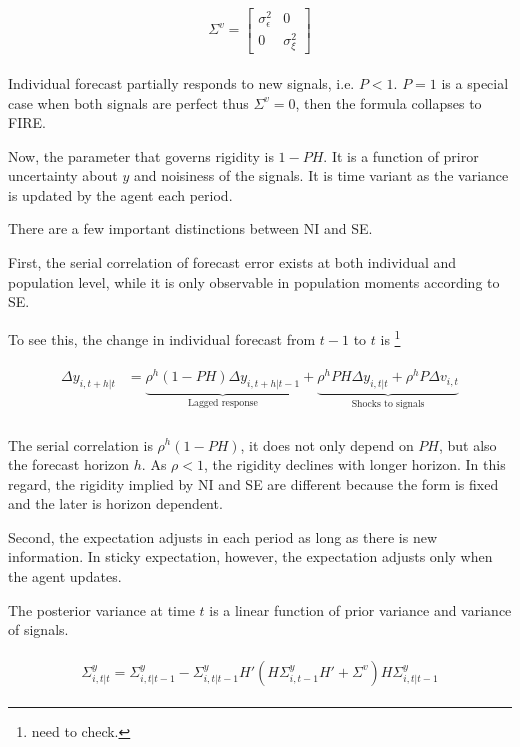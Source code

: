 \documentclass[]{article}
\begin{document}
\begin{eqnarray}
\begin{aligned}
 \Sigma^v =  \left[ \begin{matrix} 
  \sigma^2_{\epsilon} &  0 \\ 
  0 & \sigma^2_\xi \end{matrix}\right] 
\end{aligned}
\end{eqnarray}

Individual forecast partially responds to new signals, i.e. $P<1$. $P=1$ is a special case when both signals are perfect thus $\Sigma^v = 0$, then the formula collapses to FIRE. 

Now, the parameter that governs rigidity is $1-PH$. It is a function of priror uncertainty about $y$ and noisiness of the signals. It is time variant as the variance is updated by the agent each period.  

There are a few important distinctions between NI and SE. 

First, the serial correlation of forecast error exists at both individual and population level, while it is only observable in population moments according to SE. 

To see this, the change in individual forecast from $t-1$ to $t$ is \footnote{need to check.}

\begin{eqnarray}
\begin{aligned}
\Delta y_{i,t+h|t} & = \underbrace{\rho^h (1-PH)\Delta y_{i,t+h|t-1}}_{\text{Lagged response}} + \underbrace{\rho^hPH \Delta y_{i,t|t} + \rho^h P\Delta v_{i,t}}_{\text{Shocks to signals}}\\
\end{aligned}
\end{eqnarray}

The serial correlation is $\rho^h(1-PH)$, it does not only depend on $PH$, but also the forecast horizon $h$. As $\rho<1$, the rigidity declines with longer horizon. In this regard, the rigidity implied by NI and SE are different because the form is fixed and the later is horizon dependent.  

Second, the expectation adjusts in each period as long as there is new information. In sticky expectation, however, the expectation adjusts only when the agent updates. 


The posterior variance at time $t$ is a linear function of prior variance and variance of signals. 

\begin{eqnarray}
\begin{aligned}
\Sigma^y_{i,t|t} = \Sigma^y_{i,t|t-1} - \Sigma^y_{i,t|t-1} H'(H \Sigma^y_{i,t-1} H' +\Sigma^v) H \Sigma^y_{i,t|t-1} 
\end{aligned}
\end{eqnarray}
\end{document}
